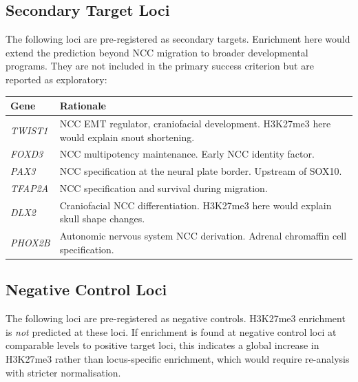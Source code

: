 \documentclass[10pt, a4paper]{article}
\begin{document}
\subsection{Secondary Target Loci}

The following loci are pre-registered as
secondary targets. Enrichment here would
extend the prediction beyond NCC migration
to broader developmental programs.
They are not included in the primary
success criterion but are reported as
exploratory:

\begin{center}
\small
\begin{tabular}{p{2.2cm}p{10.5cm}}
\toprule
\textbf{Gene} & \textbf{Rationale} \\
\midrule
\textit{TWIST1} &
NCC EMT regulator, craniofacial development.
H3K27me3 here would explain snout shortening. \\[0.2em]
\textit{FOXD3} &
NCC multipotency maintenance.
Early NCC identity factor. \\[0.2em]
\textit{PAX3} &
NCC specification at the neural plate border.
Upstream of SOX10. \\[0.2em]
\textit{TFAP2A} &
NCC specification and survival during
migration. \\[0.2em]
\textit{DLX2} &
Craniofacial NCC differentiation.
H3K27me3 here would explain skull shape
changes. \\[0.2em]
\textit{PHOX2B} &
Autonomic nervous system NCC derivation.
Adrenal chromaffin cell specification. \\
\bottomrule
\end{tabular}
\end{center}

\subsection{Negative Control Loci}

The following loci are pre-registered as
negative controls. H3K27me3 enrichment is
\textit{not} predicted at these loci.
If enrichment is found at negative control
loci at comparable levels to positive
target loci, this indicates a global
increase in H3K27me3 rather than
locus-specific enrichment, which would
require re-analysis with stricter
normalisation.
\end{document}
